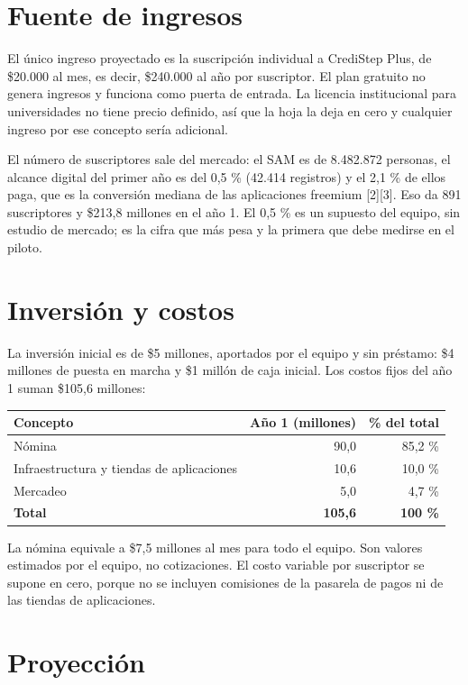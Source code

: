 \documentclass[11pt,a4paper]{article}
\begin{document}
\section{Fuente de ingresos}

El único ingreso proyectado es la suscripción individual a CrediStep Plus, de \$20.000 al mes, es decir, \$240.000 al año por suscriptor. El plan gratuito no genera ingresos y funciona como puerta de entrada. La licencia institucional para universidades no tiene precio definido, así que la hoja la deja en cero y cualquier ingreso por ese concepto sería adicional.

El número de suscriptores sale del mercado: el SAM es de 8.482.872 personas, el alcance digital del primer año es del 0,5 \% (42.414 registros) y el 2,1 \% de ellos paga, que es la conversión mediana de las aplicaciones freemium [2][3]. Eso da 891 suscriptores y \$213,8 millones en el año 1. El 0,5 \% es un supuesto del equipo, sin estudio de mercado; es la cifra que más pesa y la primera que debe medirse en el piloto.

\section{Inversión y costos}

La inversión inicial es de \$5 millones, aportados por el equipo y sin préstamo: \$4 millones de puesta en marcha y \$1 millón de caja inicial. Los costos fijos del año 1 suman \$105,6 millones:

\begin{tabularx}{\textwidth}{X r r}
  \toprule
  \textbf{Concepto} & \textbf{Año 1 (millones)} & \textbf{\% del total} \\
  \midrule
  Nómina & 90,0 & 85,2 \% \\
  Infraestructura y tiendas de aplicaciones & 10,6 & 10,0 \% \\
  Mercadeo & 5,0 & 4,7 \% \\
  \textbf{Total} & \textbf{105,6} & \textbf{100 \%} \\
  \bottomrule
\end{tabularx}

La nómina equivale a \$7,5 millones al mes para todo el equipo. Son valores estimados por el equipo, no cotizaciones. El costo variable por suscriptor se supone en cero, porque no se incluyen comisiones de la pasarela de pagos ni de las tiendas de aplicaciones.

\section{Proyección}
\end{document}
